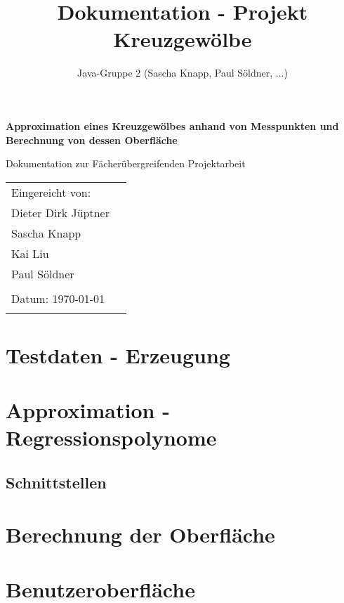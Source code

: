 \documentclass[11pt, bibliography=totocnumbered]{scrartcl}
\title{Dokumentation - Projekt Kreuzgew\"olbe}
\author{Java-Gruppe 2 (Sascha Knapp, Paul S\"oldner, ...)}
\begin{document}
	\begin{titlepage}
		\begin{center}
			\vspace*{2cm}
			
			\huge
			\textbf{Approximation eines Kreuzgew\"olbes anhand von Messpunkten und Berechnung von dessen Oberfl\"ache}
			
			\vspace{1.5cm}
			\LARGE
			Dokumentation zur F\"acher\"ubergreifenden Projektarbeit
		\end{center}    
		\vspace{1cm}
		
		\vfill{}
		\large
		\begin{tabular}{@{}l l}
			Eingereicht von: & \\
			Dieter Dirk J\"uptner \\
			Sascha Knapp \\
			Kai Liu \\
			Paul S\"oldner \\
			\\
			Datum: \today \\
			\\
		\end{tabular}
		\vfill
	\end{titlepage}
\newpage
\tableofcontents
\newpage
\section{Testdaten - Erzeugung}

\section{Approximation - Regressionspolynome}
\subsection{Schnittstellen}

\section{Berechnung der Oberfl\"ache}

\section{Benutzeroberfl\"ache}
\end{document}
